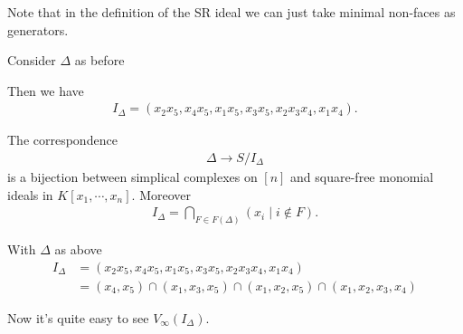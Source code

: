Note that in the definition of the SR ideal we can just take minimal non-faces as generators.

\begin{example}
    Consider $\Delta$ as before
    \begin{center}
    \end{center}

    Then we have
    \begin{align*}
        I_\Delta = ( x_2 x_5 , x_4 x_5, x_1 x_5, x_3 x_5, x_2 x_3 x_4, x_1 x_4).
    \end{align*}
\end{example}

\begin{theorem}
    The correspondence
    \begin{align*}
        \Delta \to S / I_\Delta
    \end{align*}
    is a bijection between simplical complexes on $[n]$ and square-free monomial ideals in $K[x_1, \cdots, x_n ]$. Moreover
    \begin{align*}
        I_\Delta = \bigcap_{F \in F(\Delta)} (x_i \mid i \notin F).
    \end{align*}
\end{theorem}

\begin{example}
    With $\Delta$ as above
    \begin{align*}
        I_\Delta &= ( x_2 x_5 , x_4 x_5, x_1 x_5, x_3 x_5, x_2 x_3 x_4, x_1 x_4)\\
        &= (x_4, x_5) \cap (x_1 , x_3, x_5) \cap (x_1 , x_2, x_5) \cap (x_1 , x_2, x_3, x_4)
    \end{align*}

    Now it's quite easy to see $V_\infty (I_\Delta)$.
\end{example}

